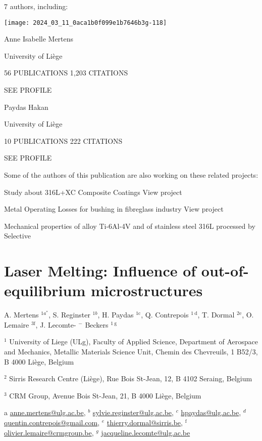 \documentclass[10pt]{article}
\begin{document}
7 authors, including:

\begin{center}
\texttt{[image: 2024\_03\_11\_0aca1b0f099e1b7646b3g-118]}
\end{center}

Anne Isabelle Mertens

University of Liège

56 PUBLICATIONS 1,203 CITATIONS

SEE PROFILE

Paydas Hakan

University of Liège

10 PUBLICATIONS 222 CITATIONS

SEE PROFILE

Some of the authors of this publication are also working on these related projects:

Study about 316L+XC Composite Coatings View project

Metal Operating Losses for bushing in fibreglass industry View project

Mechanical properties of alloy Ti-6Al-4V and of stainless steel 316L processed by Selective

\section*{Laser Melting: Influence of out-of-equilibrium microstructures}
A. Mertens ${ }^{1 a^{*}}$, S. Reginster ${ }^{1 b}$, H. Paydas ${ }^{1 \mathrm{c}}$, Q. Contrepois ${ }^{1 \mathrm{~d}}$, T. Dormal ${ }^{2 \mathrm{e}}$, O. Lemaire ${ }^{3 \mathrm{f}}$, J. Lecomte- $^{-}$ Beckers $^{1 \mathrm{~g}}$

${ }^{1}$ University of Liege (ULg), Faculty of Applied Science, Department of Aerospace and Mechanics, Metallic Materials Science Unit, Chemin des Chevreuils, 1 B52/3, B 4000 Liège, Belgium

${ }^{2}$ Sirris Research Centre (Liège), Rue Bois St-Jean, 12, B 4102 Seraing, Belgium

${ }^{3}$ CRM Group, Avenue Bois St-Jean, 21, B 4000 Liège, Belgium

a \href{mailto:anne.mertens@ulg.ac.be}{anne.mertens@ulg.ac.be}, ${ }^{b}$ \href{mailto:sylvie.reginster@ulg.ac.be}{sylvie.reginster@ulg.ac.be}, ${ }^{c}$ \href{mailto:hpaydas@ulg.ac.be}{hpaydas@ulg.ac.be}, ${ }^{d}$ \href{mailto:quentin.contrepois@gmail.com}{quentin.contrepois@gmail.com}, ${ }^{e}$ \href{mailto:thierry.dormal@sirris.be}{thierry.dormal@sirris.be}, ${ }^{\text {f }}$ \href{mailto:olivier.lemaire@crmgroup.be}{olivier.lemaire@crmgroup.be}, ${ }^{g}$ \href{mailto:jacqueline.lecomte@ulg.ac.be}{jacqueline.lecomte@ulg.ac.be}
\end{document}
